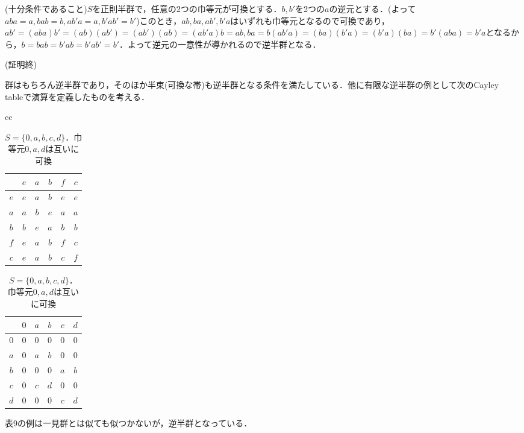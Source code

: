 (十分条件であること)$S$を正則半群で，任意の2つの巾等元が可換とする．$b,b'$を2つの$a$の逆元とする．(よって$aba=a,bab=b,ab'a=a,b'ab'=b'$)このとき，$ab,ba,ab',b'a$はいずれも巾等元となるので可換であり，$ab'=(aba)b'=(ab)(ab')=(ab')(ab)=(ab'a)b=ab,ba=b(ab'a)=(ba)(b'a)=(b'a)(ba)=b'(aba)=b'a$となるから，$b=bab=b'ab=b'ab'=b'$．よって逆元の一意性が導かれるので逆半群となる．
\begin{flushright}
(証明終)
\end{flushright}
群はもちろん逆半群であり，そのほか半束(可換な帯)も逆半群となる条件を満たしている．他に有限な逆半群の例として次のCayley　tableで演算を定義したものを考える．
\begin{table}[htbp]
\begin{center}
\begin{tabular}{cc}
\begin{minipage}{0.5\hsize}
\begin{center}
\begin{tabular}{c|ccccc}
     &$e$&$a$&$b$&$f$&$c$ \\ \hline
$e$&$e$&$a$&$b$&$e$&$e$ \\
$a$&$a$&$b$&$e$&$a$&$a$ \\
$b$&$b$&$e$&$a$&$b$&$b$ \\
$f$&$e$&$a$&$b$&$f$&$c$ \\
$c$&$e$&$a$&$b$&$c$&$f$
\end{tabular}
\caption{$S=\{e,a,b,f,c\}$は2つの群$S_1=\{e,a,b\},S_2=\{f,c\}$の和集合であり，巾等元$e,f$は可換}
\end{center}
\end{minipage}
\begin{minipage}{0.5\hsize}
\begin{center}
\begin{tabular}{c|ccccc}
     &$0$&$a$&$b$&$c$&$d$ \\ \hline
$0$&$0$&$0$&$0$&$0$&$0$ \\
$a$&$0$&$a$&$b$&$0$&$0$ \\
$b$&$0$&$0$&$0$&$a$&$b$ \\
$c$&$0$&$c$&$d$&$0$&$0$ \\
$d$&$0$&$0$&$0$&$c$&$d$
\end{tabular}
\caption{$S=\{0,a,b,c,d\}$．巾等元$0,a,d$は互いに可換}
\end{center}
\end{minipage}
\end{tabular}
\end{center}
\end{table}
表9の例は一見群とは似ても似つかないが，逆半群となっている．\\
